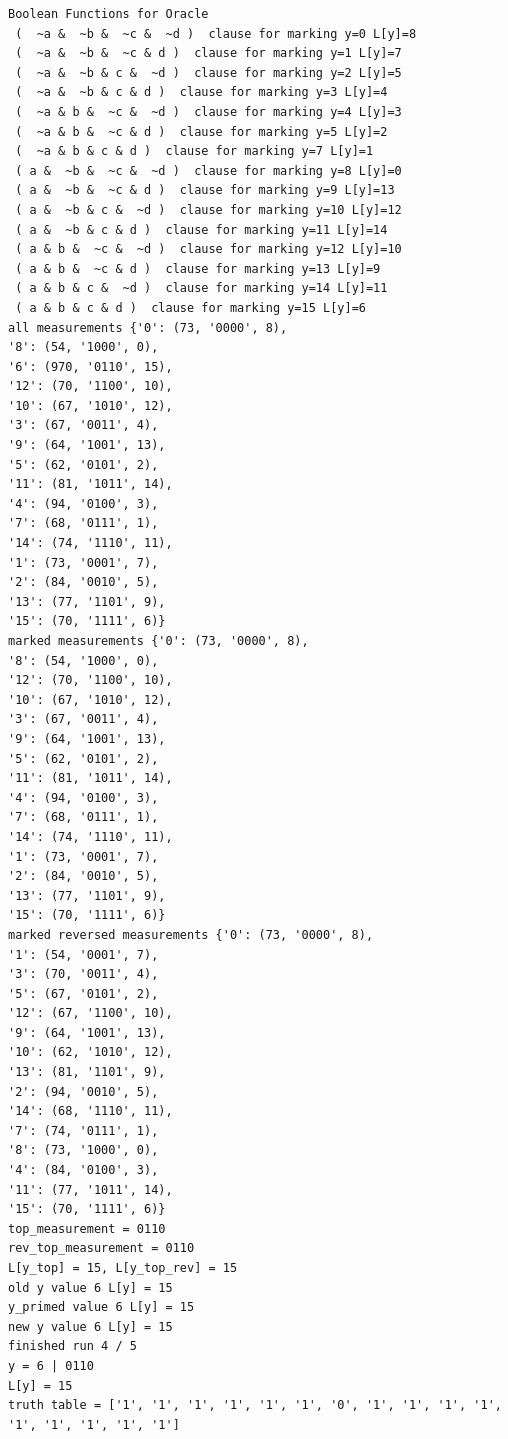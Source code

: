 \documentclass[11pt]{article}
\begin{document}
\begin{verbatim}
Boolean Functions for Oracle
 (  ~a &  ~b &  ~c &  ~d )  clause for marking y=0 L[y]=8
 (  ~a &  ~b &  ~c & d )  clause for marking y=1 L[y]=7
 (  ~a &  ~b & c &  ~d )  clause for marking y=2 L[y]=5
 (  ~a &  ~b & c & d )  clause for marking y=3 L[y]=4
 (  ~a & b &  ~c &  ~d )  clause for marking y=4 L[y]=3
 (  ~a & b &  ~c & d )  clause for marking y=5 L[y]=2
 (  ~a & b & c & d )  clause for marking y=7 L[y]=1
 ( a &  ~b &  ~c &  ~d )  clause for marking y=8 L[y]=0
 ( a &  ~b &  ~c & d )  clause for marking y=9 L[y]=13
 ( a &  ~b & c &  ~d )  clause for marking y=10 L[y]=12
 ( a &  ~b & c & d )  clause for marking y=11 L[y]=14
 ( a & b &  ~c &  ~d )  clause for marking y=12 L[y]=10
 ( a & b &  ~c & d )  clause for marking y=13 L[y]=9
 ( a & b & c &  ~d )  clause for marking y=14 L[y]=11
 ( a & b & c & d )  clause for marking y=15 L[y]=6
all measurements {'0': (73, '0000', 8), 
'8': (54, '1000', 0), 
'6': (970, '0110', 15), 
'12': (70, '1100', 10), 
'10': (67, '1010', 12), 
'3': (67, '0011', 4), 
'9': (64, '1001', 13), 
'5': (62, '0101', 2), 
'11': (81, '1011', 14), 
'4': (94, '0100', 3), 
'7': (68, '0111', 1), 
'14': (74, '1110', 11), 
'1': (73, '0001', 7), 
'2': (84, '0010', 5), 
'13': (77, '1101', 9), 
'15': (70, '1111', 6)}
marked measurements {'0': (73, '0000', 8), 
'8': (54, '1000', 0), 
'12': (70, '1100', 10), 
'10': (67, '1010', 12), 
'3': (67, '0011', 4), 
'9': (64, '1001', 13), 
'5': (62, '0101', 2), 
'11': (81, '1011', 14), 
'4': (94, '0100', 3), 
'7': (68, '0111', 1), 
'14': (74, '1110', 11), 
'1': (73, '0001', 7), 
'2': (84, '0010', 5), 
'13': (77, '1101', 9), 
'15': (70, '1111', 6)}
marked reversed measurements {'0': (73, '0000', 8), 
'1': (54, '0001', 7), 
'3': (70, '0011', 4), 
'5': (67, '0101', 2), 
'12': (67, '1100', 10), 
'9': (64, '1001', 13), 
'10': (62, '1010', 12), 
'13': (81, '1101', 9), 
'2': (94, '0010', 5), 
'14': (68, '1110', 11), 
'7': (74, '0111', 1), 
'8': (73, '1000', 0), 
'4': (84, '0100', 3), 
'11': (77, '1011', 14), 
'15': (70, '1111', 6)}
top_measurement = 0110
rev_top_measurement = 0110
L[y_top] = 15, L[y_top_rev] = 15
old y value 6 L[y] = 15
y_primed value 6 L[y] = 15
new y value 6 L[y] = 15
finished run 4 / 5
y = 6 | 0110
L[y] = 15
truth table = ['1', '1', '1', '1', '1', '1', '0', '1', '1', '1', '1', '1', '1', '1', '1', '1']


\end{verbatim}
\end{document}
